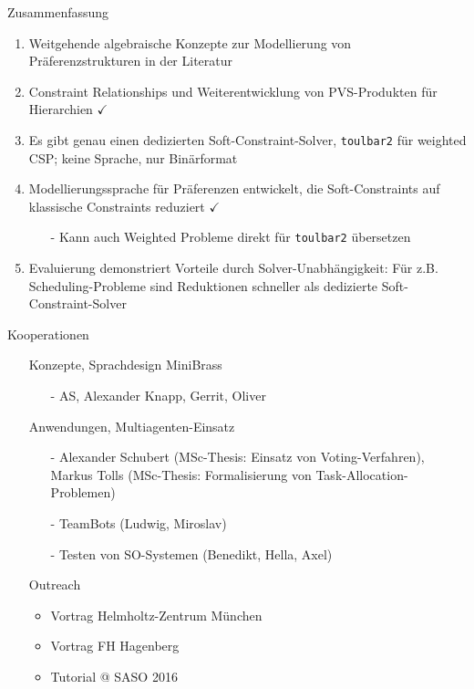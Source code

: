 \begin{frame}{Zusammenfassung}

\begin{enumerate}
\item Weitgehende algebraische Konzepte zur Modellierung von Präferenzstrukturen in der Literatur
\item Constraint Relationships und Weiterentwicklung von PVS-Produkten für Hierarchien $\checkmark$ \pause 
\vspace*{1ex}
\item Es gibt genau einen dedizierten Soft-Constraint-Solver, \texttt{toulbar2} für weighted CSP; keine Sprache, nur Binärformat
\vspace*{1ex} \pause 
\item Modellierungssprache für Präferenzen entwickelt, die Soft-Constraints auf klassische Constraints reduziert $\checkmark$
\begin{itemize}
\item[-] Kann auch Weighted Probleme direkt für \texttt{toulbar2} übersetzen
\end{itemize}
\vspace*{1ex}
\pause 
\item Evaluierung demonstriert Vorteile durch Solver-Unabhängigkeit: Für z.B. Scheduling-Probleme sind Reduktionen schneller als dedizierte Soft-Constraint-Solver
\end{enumerate}
\end{frame}

\begin{frame}{Kooperationen}
\begin{itemize}
\item[] \alert{Konzepte, Sprachdesign MiniBrass}
\begin{itemize}
\item[-] AS, Alexander Knapp, Gerrit, Oliver 
\end{itemize}
\vspace*{1ex}

\item[] \alert{Anwendungen, Multiagenten-Einsatz}
\begin{itemize}
\item[-] Alexander Schubert (MSc-Thesis: Einsatz von Voting-Verfahren), Markus Tolls (MSc-Thesis: Formalisierung von Task-Allocation-Problemen)
\item[-] TeamBots (Ludwig, Miroslav)
\item[-] Testen von SO-Systemen (Benedikt, Hella, Axel) 
\end{itemize}
\vspace*{1ex}
\item[] \alert{Outreach}
\begin{itemize}
\item Vortrag Helmholtz-Zentrum München
\item Vortrag FH Hagenberg
\item Tutorial @ SASO 2016
\end{itemize}

\end{itemize}
\end{frame}

